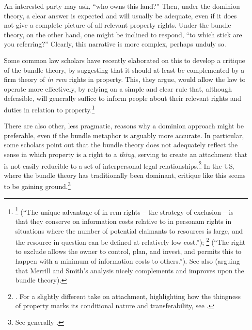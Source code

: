 \documentclass[12pt,a4paper]{book} %
\begin{document}
An interested party may ask, ``who owns this land?'' Then, under the dominion theory, a clear answer is expected and will usually be adequate, even if it does not give a complete picture of all relevant property rights. Under the bundle theory, on the other hand, one might be inclined to respond, ``to which stick are you referring?'' Clearly, this narrative is more complex, perhaps unduly so. 

Some common law scholars have recently elaborated on this to develop a critique of the bundle theory, by suggesting that it should at least be complemented by a firm theory of {\it in rem} rights in property. This, they argue, would allow the law to operate more effectively, by relying on a simple and clear rule that, although defeasible, will generally suffice to inform people about their relevant rights and duties in relation to property.\footnote{\footcite[793]{merrill01b} (``The unique advantage of in rem rights -- the strategy of exclusion -- is that they conserve on information costs relative to in personam rights in situations where the number of potential claimants to resources is large, and the resource in question can be defined at relatively low cost.''); \footcite[389]{merrill01} (``The right to exclude allows the owner to control, plan, and invest, and permits this to happen with a minimum of information costs to others.''). See also \cite{ellickson11} (arguing that Merrill and Smith's analysis nicely complements and improves upon the bundle theory).} 

There are also other, less pragmatic, reasons why a dominion approach might be preferable, even if the bundle metaphor is arguably more accurate. In particular, some scholars point out that the bundle theory does not adequately reflect the sense in which property is a right to a {\it thing}, serving to create an attachment that is not easily reducible to a set of interpersonal legal relationships.\footnote{\cite[1862]{merrill07}. For a slightly different take on attachment, highlighting how the thingness of property marks its conditional nature and transferability, see \cite[799-818]{penner96}.} In the US, where the bundle theory has traditionally been dominant, critique like this seems to be gaining ground.\footnote{See generally \cite{foster10}.}
\end{document}

